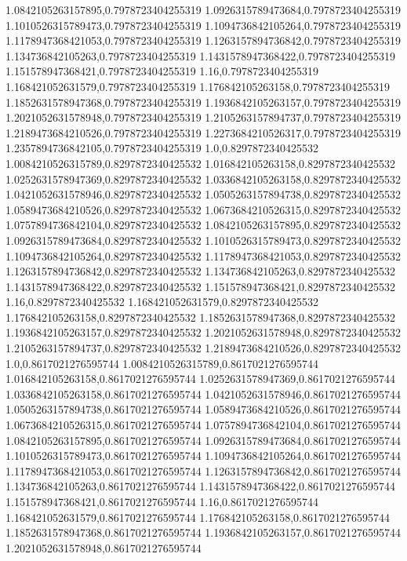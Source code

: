 1.0842105263157895,0.7978723404255319
1.0926315789473684,0.7978723404255319
1.1010526315789473,0.7978723404255319
1.1094736842105264,0.7978723404255319
1.1178947368421053,0.7978723404255319
1.1263157894736842,0.7978723404255319
1.134736842105263,0.7978723404255319
1.1431578947368422,0.7978723404255319
1.151578947368421,0.7978723404255319
1.16,0.7978723404255319
1.168421052631579,0.7978723404255319
1.176842105263158,0.7978723404255319
1.1852631578947368,0.7978723404255319
1.1936842105263157,0.7978723404255319
1.2021052631578948,0.7978723404255319
1.2105263157894737,0.7978723404255319
1.2189473684210526,0.7978723404255319
1.2273684210526317,0.7978723404255319
1.2357894736842105,0.7978723404255319
1.0,0.8297872340425532
1.0084210526315789,0.8297872340425532
1.016842105263158,0.8297872340425532
1.0252631578947369,0.8297872340425532
1.0336842105263158,0.8297872340425532
1.0421052631578946,0.8297872340425532
1.0505263157894738,0.8297872340425532
1.0589473684210526,0.8297872340425532
1.0673684210526315,0.8297872340425532
1.0757894736842104,0.8297872340425532
1.0842105263157895,0.8297872340425532
1.0926315789473684,0.8297872340425532
1.1010526315789473,0.8297872340425532
1.1094736842105264,0.8297872340425532
1.1178947368421053,0.8297872340425532
1.1263157894736842,0.8297872340425532
1.134736842105263,0.8297872340425532
1.1431578947368422,0.8297872340425532
1.151578947368421,0.8297872340425532
1.16,0.8297872340425532
1.168421052631579,0.8297872340425532
1.176842105263158,0.8297872340425532
1.1852631578947368,0.8297872340425532
1.1936842105263157,0.8297872340425532
1.2021052631578948,0.8297872340425532
1.2105263157894737,0.8297872340425532
1.2189473684210526,0.8297872340425532
1.0,0.8617021276595744
1.0084210526315789,0.8617021276595744
1.016842105263158,0.8617021276595744
1.0252631578947369,0.8617021276595744
1.0336842105263158,0.8617021276595744
1.0421052631578946,0.8617021276595744
1.0505263157894738,0.8617021276595744
1.0589473684210526,0.8617021276595744
1.0673684210526315,0.8617021276595744
1.0757894736842104,0.8617021276595744
1.0842105263157895,0.8617021276595744
1.0926315789473684,0.8617021276595744
1.1010526315789473,0.8617021276595744
1.1094736842105264,0.8617021276595744
1.1178947368421053,0.8617021276595744
1.1263157894736842,0.8617021276595744
1.134736842105263,0.8617021276595744
1.1431578947368422,0.8617021276595744
1.151578947368421,0.8617021276595744
1.16,0.8617021276595744
1.168421052631579,0.8617021276595744
1.176842105263158,0.8617021276595744
1.1852631578947368,0.8617021276595744
1.1936842105263157,0.8617021276595744
1.2021052631578948,0.8617021276595744

